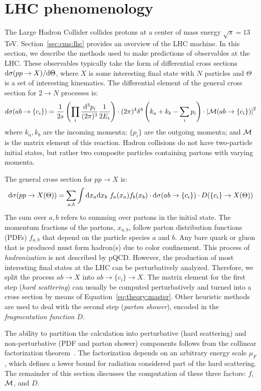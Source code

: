 \section{LHC phenomenology}

The Large Hadron Collider collides protons at a center of mass energy $\sqrt{s} = 13$ TeV.
Section~\ref{sec:cms:lhc} provides an overview of the LHC machine.
In this section, we describe the methods used to make predictions of observables at the LHC.
These observables typically take the form of differential cross sections $\mathrm{d}\sigma(pp\rightarrow X)/\mathrm{d}\Theta$, where $X$ is some interesting final state with $N$ particles and $\Theta$ is a set of interesting kinematics.
The differential element of the general cross section for $2\rightarrow N$ processes is:
\begin{equation}
d\sigma(ab\rightarrow \{c_i\}) = 
    \frac{1}{2s} \left(\prod_i \dfrac{\mathrm{d}^3p_i}{(2\pi)^3} \frac{1}{2E_i}\right) 
        \cdot (2\pi)^4 \delta^4\left(k_a + k_b - \sum_i p_i\right) 
        \cdot \left|\mathcal{M}(ab\rightarrow \{c_i\})\right|^2
        \label{eq:theory:2n}
\end{equation}
where $k_a,k_b$ are the incoming momenta; $\{p_i\}$ are the outgoing momenta; and $\mathcal{M}$ is the matrix element of this reaction.
Hadron collisions do not have two-particle initial states, but rather two composite particles containing partons with varying momenta. 

The general cross section for $pp\rightarrow X$ is:
\begin{equation}
\mathrm{d}\sigma(pp\rightarrow X(\Theta)) = 
    \sum_{a,b} \int \mathrm{d}x_a \mathrm{d}x_b 
    ~f_a(x_a) f_b(x_b) 
    \cdot \mathrm{d}\sigma(ab\rightarrow\{c_i\}) 
    \cdot D(\{c_i\}\rightarrow X(\Theta))
    \label{eq:theory:master}
\end{equation}
The sum over $a,b$ refers to summing over partons in the initial state.
The momentum fractions of the partons, $x_{a,b}$, follow parton distribution functions (PDFs) $f_{a,b}$ that depend on the particle species $a$ and $b$. 
Any bare quark or gluon that is produced must form hadron(s) due to color confinement.
This process of \emph{hadronization} is not described by pQCD.
However, the production of most interesting final states at the LHC can be perturbatively analyzed.
Therefore, we split the process $ab\rightarrow X$ into $ab\rightarrow \{c_i\} \rightarrow X$.
The matrix element for the first step (\emph{hard scattering}) can usually be computed perturbatively and turned into a cross section by means of Equation~\ref{eq:theory:master}.
Other heuristic methods are used to deal with the second step (\emph{parton shower}), encoded in the \emph{fragmentation function} $D$. 

The ability to partition the calculation into perturbative (hard scattering) and non-perturbative (PDF and parton shower) components follows from the collinear factorization theorem~\cite{fact}.
The factorization depends on an arbitrary energy scale $\mu_F$, which defines a lower bound for radiation considered part of the hard scattering. 
The remainder of this section discusses the computation of these three factors: $f$, $\mathcal{M}$, and $D$.
